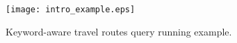 
\begin{figure}[t]
\centering
\texttt{[image: intro\_example.eps]}
\caption{Keyword-aware travel routes query running example.}
\label{fig:running_example}
\end{figure}

